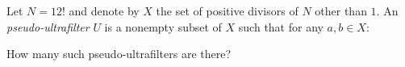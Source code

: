 Let $N = 12!$ and denote by $X$ the set of positive divisors of $N$ other than $1$.
An \emph{pseudo-ultrafilter} $U$ is a nonempty subset of $X$ such that for any $a,b \in X$:
\begin{itemize}
\end{itemize}
How many such pseudo-ultrafilters are there?
